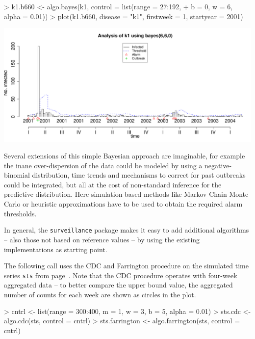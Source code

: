 \documentclass[a4paper,11pt]{article}
\begin{document}
\begin{Schunk}
\begin{Sinput}
> k1.b660 <- algo.bayes(k1, control = list(range = 27:192, 
+     b = 0, w = 6, alpha = 0.01))
> plot(k1.b660, disease = "k1", firstweek = 1, startyear = 2001)
\end{Sinput}
\end{Schunk}
\includegraphics{figs/vignette-004}

Several extensions of this simple Bayesian approach are imaginable,
for example the inane over-dispersion of the data could be modeled by
using a negative-binomial distribution, time trends and mechanisms to
correct for past outbreaks could be integrated, but all at the cost of
non-standard inference for the predictive distribution. Here
simulation based methods like Markov Chain Monte Carlo or heuristic
approximations have to be used to obtain the required alarm
thresholds.

In general, the \verb+surveillance+ package makes it easy to add
additional algorithms -- also those not based on reference values --
by using the existing implementations as starting point.

The following call uses the CDC and Farrington procedure on the
simulated time series \verb+sts+ from page~\pageref{ex:sts}. Note that
the CDC procedure operates with four-week aggregated data -- to better
compare the upper bound value, the aggregated number of counts for
each week are shown as circles in the plot.

\begin{Schunk}
\begin{Sinput}
> cntrl <- list(range = 300:400, m = 1, w = 3, b = 5, alpha = 0.01)
> sts.cdc <- algo.cdc(sts, control = cntrl)
> sts.farrington <- algo.farrington(sts, control = cntrl)
\end{Sinput}
\end{Schunk}
\end{document}
